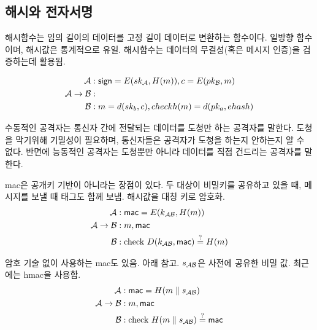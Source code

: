 \subsection*{해시와 전자서명}

해시함수는 임의 길이의 데이터를 고정 길이 데이터로 변환하는 함수이다. 일방향
함수이며, 해시값은 통계적으로 유일. 해시함수는 데이터의 무결성(혹은 메시지 인증)을 검증하는데
활용됨.

\begin{equation}
  \begin{split}
    \mathcal{A} &: \textsf{sign} = E(sk_{\mathcal{A}}, H(m)), c = E(pk_{\mathcal{B}}, m) \\
    \mathcal{A} \to \mathcal{B} &: \\
    \mathcal{B} &: m = d(sk_b, c), check h(m) = d(pk_a, ehash)
  \end{split}
\end{equation}


수동적인 공격자는 통신자 간에 전달되는 데이터를 도청만 하는 공격자를 말한다.
도청을 막기위해 기밀성이 필요하며, 통신자들은 공격자가 도청을 하는지 안하는지 알
수 없다. 반면에 능동적인 공격자는 도청뿐만 아니라 데이터를 직접 건드리는
공격자를 말한다.

mac은 공개키 기반이 아니라는 장점이 있다. 두 대상이 비밀키를 공유하고 있을 때,
메시지를 보낼 때 태그도 함께 보냄. 해시값을 대칭 키로 암호화.
\begin{equation}
  \begin{split}
    \mathcal{A} &: \textsf{mac} = E(k_{\mathcal{A} \mathcal{B}}, H(m)) \\
    \mathcal{A} \to \mathcal{B} &: m, \textsf{mac} \\
    \mathcal{B} &: \text{check } D(k_{\mathcal{A} \mathcal{B}}, \textsf{mac}) \overset{?}{=} H(m)
  \end{split}
\end{equation}

암호 기술 없이 사용하는 mac도 있음. 아래 참고. $s_{\mathcal{A} \mathcal{B}}$은 사전에 공유한 비밀 값.
최근에는 hmac을 사용함.
\begin{equation}
  \begin{split}
    \mathcal{A} &: \textsf{mac} = H(m \parallel s_{\mathcal{A} \mathcal{B}}) \\
    \mathcal{A} \to \mathcal{B} &: m, \textsf{mac} \\
    \mathcal{B} &: \text{check } H(m \parallel s_{\mathcal{A} \mathcal{B}}) \overset{?}{=} \textsf{mac}
  \end{split}
\end{equation}

